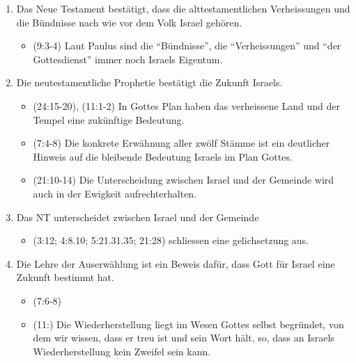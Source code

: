\documentclass{../../inc/mybib}
\begin{document}
\begin{enumerate}
\begin{itemize}
    \end{itemize}
    \item Das Neue Testament bestätigt, dass die alttestamentlichen Verheissungen und die Bündnisse nach wie vor dem Volk Israel gehören.
    \begin{itemize}
        \item {}(9:3-4) Laut Paulus sind die \enquote{Bündnisse}, die \enquote{Verheissungen} und \enquote{der Gottesdienst} immer noch Israels Eigentum.
    \end{itemize}
    \item Die neutestamentliche Prophetie bestätigt die Zukunft Israels.
    \begin{itemize}
        \item {}(24:15-20), (11:1-2) In Gottes Plan haben das verheissene Land und der Tempel eine zukünftige Bedeutung.
        \item {}(7:4-8) Die konkrete Erwähnung aller zwölf Stämme ist ein deutlicher Hinweis auf die bleibende Bedeutung Israels im Plan Gottes.
        \item {}(21:10-14) Die Unterscheidung zwischen Israel und der Gemeinde wird auch in der Ewigkeit aufrechterhalten.
    \end{itemize}
    \item Das NT unterscheidet zwischen Israel und der Gemeinde
    \begin{itemize}
        \item {}(3:12; 4:8.10; 5:21.31.35; 21:28) schliessen eine gelichsetzung aus.
    \end{itemize}
    \item Die Lehre der Auserwählung ist ein Beweis dafür, dass Gott für Israel eine Zukunft bestimmt hat.
    \begin{itemize}
        \item {}(7:6-8)
        \item {}(11:) Die Wiederherstellung liegt im Wesen Gottes selbst begründet, von dem wir wissen, dass er treu ist und sein Wort hält, so, dass an Israels Wiederherstellung kein Zweifel sein kann.
    \end{itemize}    
\end{enumerate}
\end{document}
